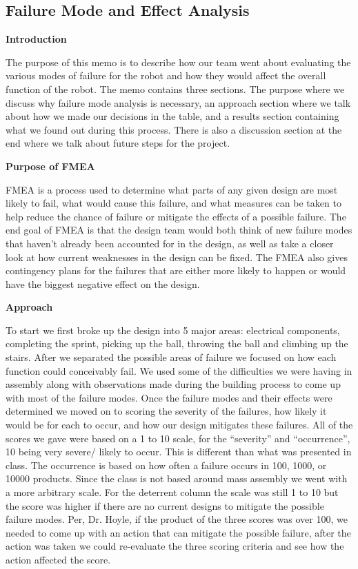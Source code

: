 \documentclass[12pt,letterpaper,titlepage]{article}
\begin{document}
\subsection{Failure Mode and Effect Analysis}

\smallskip\noindent\textbf{Introduction}

The purpose of this memo is to describe how our team went about evaluating the various modes of failure for the robot and how they would affect the overall function of the robot. The memo contains three sections. The purpose where we discuss why failure mode analysis is necessary, an approach section where we talk about how we made our decisions in the table, and a results section containing what we found out during this process. There is also a discussion section at the end where we talk about future steps for the project.

\smallskip\noindent\textbf{Purpose of FMEA}

FMEA is a process used to determine what parts of any given design are most likely to fail, what would cause this failure, and what measures can be taken to help reduce the chance of failure or mitigate the effects of a possible failure. The end goal of FMEA is that the design team would both think of new failure modes that haven't already been accounted for in the design, as well as take a closer look at how current weaknesses in the design can be fixed. The FMEA also gives contingency plans for the failures that are either more likely to happen or would have the biggest negative effect on the design.

\smallskip\noindent\textbf{Approach}

To start we first broke up the design into 5 major areas: electrical components, completing the sprint, picking up the ball, throwing the ball and climbing up the stairs. After we separated the possible areas of failure we focused on how each function could conceivably fail. We used some of the difficulties we were having in assembly along with observations made during the building process to come up with most of the failure modes. Once the failure modes and their effects were determined we moved on to scoring the severity of the failures, how likely it would be for each to occur, and how our design mitigates these failures. All of the scores we gave were based on a 1 to 10 scale, for the “severity” and “occurrence”, 10 being very severe/ likely to occur. This is different than what was presented in class. The occurrence is based on how often a failure occurs in 100, 1000, or 10000 products. Since the class is not based around mass assembly we went with a more arbitrary scale. For the deterrent column the scale was still 1 to 10 but the score was higher if there are no current designs to mitigate the possible failure modes. Per, Dr. Hoyle, if the product of the three scores was over 100, we needed to come up with an action that can mitigate the possible failure, after the action was taken we could re-evaluate the three scoring criteria and see how the action affected the score.
\end{document}
